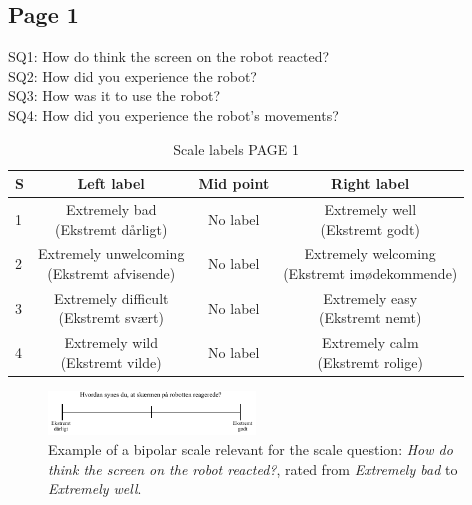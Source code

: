 \subsection{Page 1}
\noindent
SQ1: How do think the screen on the robot reacted? \\%
SQ2: How did you experience the robot? \\ %
SQ3: How was it to use the robot?\\%
SQ4: How did you experience the robot's movements? \\%
\begin{table}[H]
	\centering
\caption{Scale labels PAGE 1}
	\label{tab:ScalesPage1} 
	\begin{tabular}{l|c|c|c}
		S     & Left label & Mid point & Right label \\\hline
		1   & \makecell{Extremely bad\\(Ekstremt dårligt)}  & No label & \makecell{Extremely well \\(Ekstremt godt)}        \\\hline
		2   & \makecell{Extremely unwelcoming \\(Ekstremt afvisende)} & No label & \makecell{Extremely welcoming \\(Ekstremt imødekommende)}         \\\hline
		3   & \makecell{Extremely difficult \\(Ekstremt svært)} & No label & \makecell{Extremely easy \\(Ekstremt nemt)}         \\\hline
	 	4   & \makecell{Extremely wild \\(Ekstremt vilde)} & No label & \makecell{Extremely calm \\(Ekstremt rolige)}               
	\end{tabular}        
\end{table}
\noindent
%
\begin{figure}[H]
\centering
\includegraphics[width = 0.49\textwidth]{Figure/TilpassetSkaermensReaktion}
\setlength{} 
\caption{Example of a bipolar scale relevant for the scale question: \textit{How do think the screen on the robot reacted?}, rated from \textit{Extremely bad} to \textit{Extremely well}.}
\label{fig:TilpassetSkaermensReaktion}
\end{figure}
\noindent
% 
